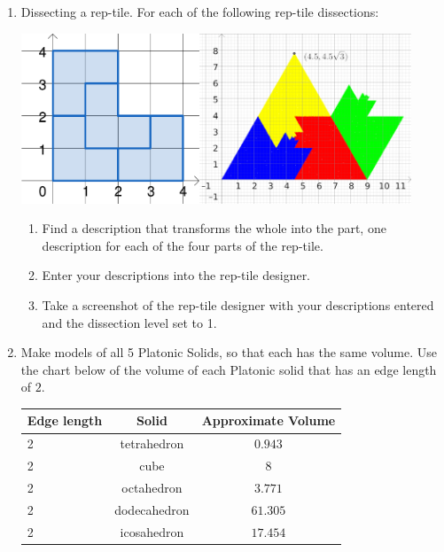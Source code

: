 \begin{enumerate}
\item Dissecting a rep-tile. For each of the following rep-tile dissections:
\begin{center}
    \includegraphics[height=2in]{images/rep-tiles-25}\hspace{.5in}\includegraphics[height=2in]{images/rep-tiles-30}
\end{center}
\begin{enumerate}
\item Find a description that transforms the whole into the part, one description for each of the four parts of the rep-tile.
\item Enter your descriptions into the rep-tile designer.
\item Take a screenshot of the rep-tile designer with your descriptions entered and the dissection level set to 1.
\end{enumerate}


\item Make models of all 5 Platonic Solids, so that each has the same volume. Use the chart below of the volume of each Platonic solid that has an edge length of $2$.

\begin{tabular}{| l | c| c|}
\hline
Edge length & Solid & Approximate Volume\\
\hline
2 & tetrahedron & $0.943$\\
\hline
2 & cube & $8$\\
\hline
2 & octahedron & $ 3.771$\\
\hline
2 & dodecahedron & $ 61.305$\\
\hline
2 & icosahedron & $17.454$\\
\hline
\end{tabular}


\end{enumerate}
